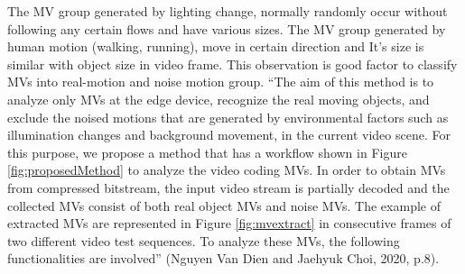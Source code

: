 The MV group generated by lighting change, normally randomly occur without following any certain flows and have various sizes. The MV group generated by human motion (walking, running),  move in certain direction and It’s size is similar with object size in video frame. This observation is good factor to classify MVs into real-motion and noise motion group. “The aim of this method is to analyze only MVs at the edge device, recognize the real moving objects, and exclude the noised motions that are generated by environmental factors such as illumination changes and background movement, in the current video scene. For this purpose, we propose a method that has a workflow shown in Figure \ref{fig:proposedMethod} to analyze the video coding MVs. In order to obtain MVs from compressed bitstream, the input video stream is partially decoded and the collected MVs consist of both real object MVs and noise MVs. The example of extracted MVs are represented in Figure \ref{fig:mvextract} in consecutive frames of two different video test sequences. To analyze these MVs, the following functionalities are involved” (Nguyen Van Dien and Jaehyuk Choi, 2020, p.8).
